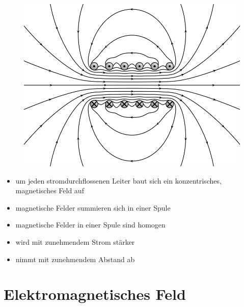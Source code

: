 \begin{frame}
\begin{center}
\begin{minipage}{0.45\textwidth}
\begin{center}
\begin{figure}
          \includegraphics[width=\textwidth,height=.3\textheight,keepaspectratio]{e08/VFPt_cylindrical_coil_real.png}\\
        \end{figure}
            \end{center}
        \end{minipage}
       
        \bigskip

        \begin{itemize}
            \item um jeden stromdurchflossenen Leiter baut sich ein konzentrisches, magnetisches Feld auf
            \item magnetische Felder summieren sich in einer Spule
            \item magnetische Felder in einer Spule sind homogen
            \item wird mit zunehmendem Strom stärker
            \item nimmt mit zunehmendem Abstand ab
        \end{itemize}

    \end{center}
\end{frame}

\section*{Elektro\-magnetisches Feld}

